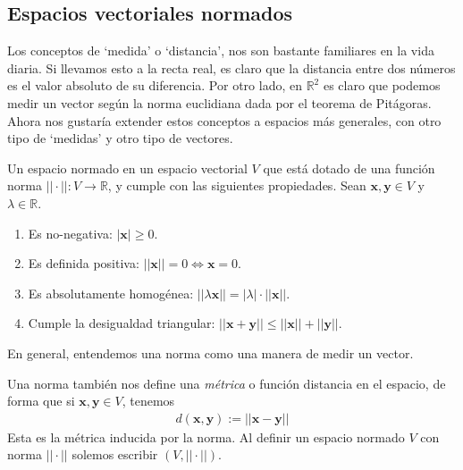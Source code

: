 \documentclass[12pt]{book}
\begin{document}
\subsection{Espacios vectoriales normados}
\noindent
Los conceptos de `medida' o `distancia', nos son bastante familiares en la vida diaria. Si llevamos esto a la recta real, es claro que la distancia entre dos números es el valor absoluto de su diferencia. Por otro lado, en $\mathbb{R}^2$ es claro que podemos medir un vector según la norma euclidiana dada por el teorema de Pitágoras. Ahora nos gustaría extender estos conceptos a espacios más generales, con otro tipo de `medidas' y otro tipo de vectores.

\begin{definitionenv}
    Un espacio normado en un espacio vectorial $V$ que está dotado de una función norma $||\cdot||:V\to\mathbb{R}$, y cumple con las siguientes propiedades. Sean $\mathbf{x},\mathbf{y}\in V$ y $\lambda\in \mathbb{R}$.
    \begin{enumerate}
        \item Es no-negativa: $|\mathbf{x}|\ge 0$.
        \item Es definida positiva: $||\mathbf{x}||=0\iff \mathbf{x}=0$.
        \item Es absolutamente homogénea: $||\lambda\mathbf{x}||=|\lambda|\cdot ||\mathbf{x}||$.
        \item Cumple la desigualdad triangular: $||\mathbf{x}+\mathbf{y}||\leq ||\mathbf{x}||+||\mathbf{y}||$.
    \end{enumerate}
\end{definitionenv}

En general, entendemos una norma como una manera de medir un vector.

Una norma también nos define una \textit{métrica} o función distancia en el espacio, de forma que si $\mathbf{x}, \mathbf{y}\in V$, tenemos
\begin{align*}
    d(\mathbf{x},\mathbf{y}):=||\mathbf{x}-\mathbf{y}||
\end{align*}
Esta es la métrica inducida por la norma. Al definir un espacio normado $V$ con norma $||\cdot||$ solemos escribir $(V,||\cdot||)$.\\
\end{document}
